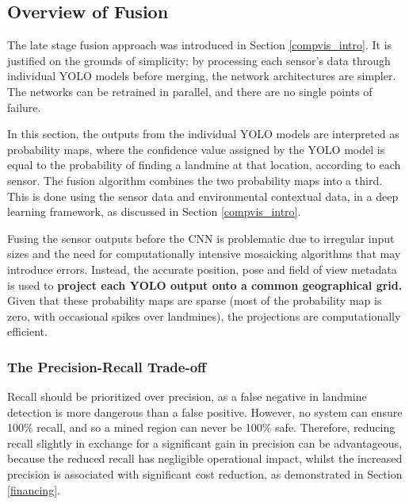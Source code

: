 \subsection{Overview of Fusion} \label{fusion_overview}

    \noindent The late stage fusion approach was introduced in Section \ref{compvis_intro}. It is justified on the grounds of simplicity; by processing each sensor's data through individual YOLO models before merging, the network architectures are simpler. The networks can be retrained in parallel, and there are no single points of failure. 
    


    \noindent In this section, the outputs from the individual YOLO models are interpreted as probability maps, where the confidence value assigned by the YOLO model is equal to the probability of finding a landmine at that location, according to each sensor. The fusion algorithm combines the two probability maps into a third. This is done using the sensor data and environmental contextual data, in a deep learning framework, as discussed in Section \ref{compvis_intro}.

    Fusing the sensor outputs before the CNN is problematic due to irregular input sizes and the need for computationally intensive mosaicking algorithms that may introduce errors. Instead, the accurate position, pose and field of view metadata  is used to \textbf{project each YOLO output onto a common geographical grid.} Given that these probability maps are sparse (most of the probability map is zero, with occasional spikes over landmines), the projections are computationally efficient.

    \subsubsection{The Precision-Recall Trade-off } \label{lossmatrix}

        Recall should be prioritized over precision, as a false negative in landmine detection is more dangerous than a false positive. However, no system can ensure 100\% recall, and so a mined region can never be 100\% safe. Therefore, reducing recall slightly in exchange  for a significant gain in precision can be advantageous, because the reduced recall has negligible operational impact, whilst the increased precision is associated with significant cost reduction, as demonstrated in Section \ref{financing}.